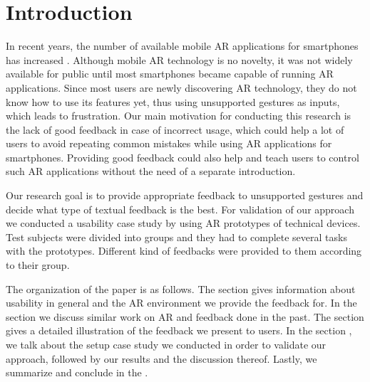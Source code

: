\documentclass[11pt, a4paper]{article}
\begin{document}
	\section*{Introduction}\label{sec:introduction}

		In recent years, the number of available mobile \ac{AR} applications for smartphones has increased \cite{Tractica2017}. Although mobile \ac{AR} technology is no novelty, it was not widely available for {public until most smartphones became} capable of running \ac{AR} applications. Since most users are newly discovering \ac{AR} technology, they {do not} know how to use its features yet, thus using unsupported gestures as {inputs}, which leads to frustration. Our main motivation for conducting this research is the lack of good feedback in case of incorrect usage, which could help a lot of users to avoid repeating common mistakes while using \ac{AR} applications for smartphones. Providing good feedback could also help and teach users to control such \ac{AR} applications without the need of a separate introduction.

		Our research goal is to provide appropriate feedback to unsupported gestures and decide what type of textual feedback is the best. {For validation of our approach we conducted a usability case study by using \ac{AR} prototypes of technical devices. Test subjects were divided into groups and they had to complete several tasks with the prototypes. Different kind of  feedbacks were provided to them according to their group.}

		The organization of the paper is as follows. The section  gives information about usability in general and the \ac{AR} environment we provide the feedback for. In the section  we discuss similar work on \ac{AR} and feedback done in the past. The  section gives a detailed illustration of the feedback we present to users. In the section , we talk about the setup case study we conducted in order to validate our approach, followed by our results and the discussion thereof. Lastly, we summarize and conclude in the .
\end{document}
